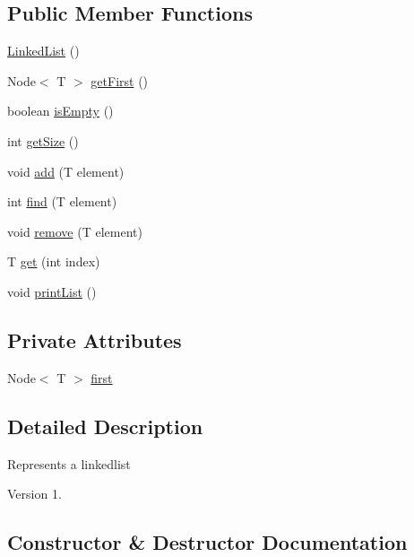 \subsection*{Public Member Functions}
\begin{DoxyCompactItemize}
\item 
\mbox{\hyperlink{class_linked_list_ae04bfb6ff80214a33132ba72ceb117aa}{Linked\+List}} ()
\item 
Node$<$ T $>$ \mbox{\hyperlink{class_linked_list_a97e865343f67ed5879567bfb1d362a19}{get\+First}} ()
\item 
boolean \mbox{\hyperlink{class_linked_list_aecae3d82587c52087a4f65d6c56900e2}{is\+Empty}} ()
\item 
int \mbox{\hyperlink{class_linked_list_a7ea3fa6fa5601039076c2a6c8fe88219}{get\+Size}} ()
\item 
void \mbox{\hyperlink{class_linked_list_af7ec408e2f1040643d77f614af535988}{add}} (T element)
\item 
int \mbox{\hyperlink{class_linked_list_abb5fc485a297b815daf6034f1c455979}{find}} (T element)
\item 
void \mbox{\hyperlink{class_linked_list_a85388ca2d7e4c8bc06fbea2c6fcfea33}{remove}} (T element)
\item 
T \mbox{\hyperlink{class_linked_list_a032ef46fc54f12525746d9f7c3a80663}{get}} (int index)
\item 
void \mbox{\hyperlink{class_linked_list_aaa02d6cede50240f57de8115fbbc5b4d}{print\+List}} ()
\end{DoxyCompactItemize}
\subsection*{Private Attributes}
\begin{DoxyCompactItemize}
\item 
Node$<$ T $>$ \mbox{\hyperlink{class_linked_list_a34f1f7a8bd8fd70f2131b2e82f58cb32}{first}}
\end{DoxyCompactItemize}


\subsection{Detailed Description}
Represents a linkedlist \begin{DoxyVersion}{Version}
1. 
\end{DoxyVersion}


\subsection{Constructor \& Destructor Documentation}
\mbox{\label{class_linked_list_ae04bfb6ff80214a33132ba72ceb117aa}} 
